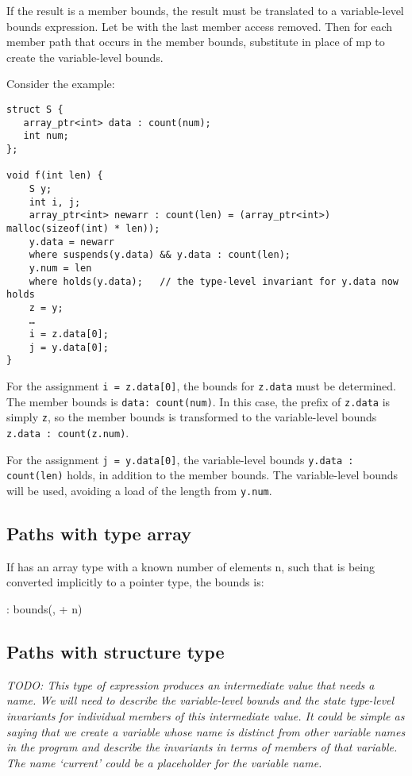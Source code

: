 If the result is a member bounds, the result must be translated to a
variable-level bounds expression. Let  be  with the
last member access removed. Then for each member path  that
occurs in the member bounds, substitute  in place of mp
to create the variable-level bounds.

Consider the example:
\begin{verbatim}
struct S {
   array_ptr<int> data : count(num);
   int num;
};

void f(int len) {
    S y;
    int i, j;
    array_ptr<int> newarr : count(len) = (array_ptr<int>) malloc(sizeof(int) * len));
    y.data = newarr
    where suspends(y.data) && y.data : count(len);
    y.num = len
    where holds(y.data);   // the type-level invariant for y.data now holds
    z = y;
    …
    i = z.data[0];
    j = y.data[0];
}
\end{verbatim}

For the assignment \texttt{i = z.data[0]}, the bounds for
\texttt{z.data} must be determined. The member bounds is \texttt{data:
count(num)}. In this case, the prefix of \texttt{z.data} is simply
\texttt{z}, so the member bounds is transformed to the variable-level
bounds \texttt{z.data : count(z.num)}.

For the assignment \texttt{j = y.data[0]}, the variable-level bounds
\texttt{y.data : count(len)} holds, in addition to the member bounds.
The variable-level bounds will be used, avoiding a load of the length
from \texttt{y.num}.

\subsection{Paths with type array}

If  has an array type with a known number of elements n,
such that  is being converted implicitly to a pointer type,
the bounds is:

 : bounds(,  + n)

\subsection{Paths with structure type}

\emph{TODO: This type of expression produces an intermediate value that
needs a name. We will need to describe the variable-level bounds and the
state type-level invariants for individual members of this intermediate
value. It could be simple as saying that we create a variable whose name
is distinct from other variable names in the program and describe the
invariants in terms of members of that variable. The name `current'
could be a placeholder for the variable name.}

